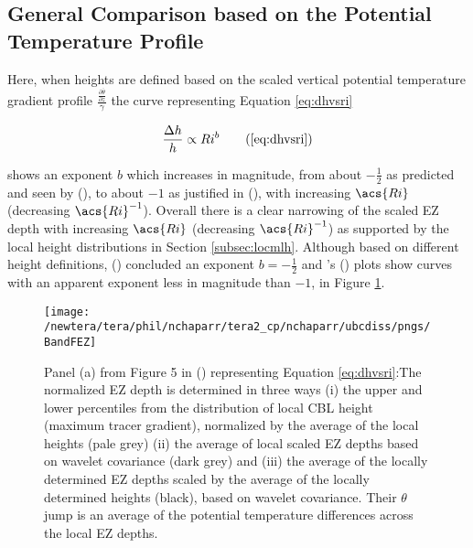 \subsection{General Comparison based on the Potential Temperature Profile}

Here, when heights are defined based on the scaled vertical potential temperature gradient profile $\frac{\frac{\partial \overline{\theta}}{\partial z}}{\gamma}$ the curve representing Equation \ref{eq:dhvsri} 

\begin{equation}
\frac{\Delta h}{h} \propto Ri^{b} \tag{\ref{eq:dhvsri}}
\end{equation}

shows an exponent $b$ which increases in magnitude, from about $-\frac{1}{2}$ as predicted and seen by \citeauthor{Boers89} (\citeyear{Boers89}), to about $-1$ as justified in \citeauthor{StullNelEl} (\citeyear{StullNelEl}),  with increasing $\acs{Ri}$ (decreasing $\acs{Ri}^{-1}$).  Overall there is a clear narrowing of the scaled \acs{EZ} depth with increasing $\acs{Ri}$ (decreasing $\acs{Ri}^{-1}$) as supported by the local height distributions in Section \ref{subsec:locmlh}.  Although based on different height definitions, \citeauthor{FedConzMir04} (\citeyear{FedConzMir04}) concluded an exponent $b = -\frac{1}{2}$ and \citeauthor{BrooksFowler2}'s (\citeyear{BrooksFowler2}) plots show curves with an apparent exponent less in magnitude than $-1$, in Figure \ref{fig:BandFEZ}. \\

\begin{figure}[htbp]
    \centering
    \texttt{[image: /newtera/tera/phil/nchaparr/tera2\_cp/nchaparr/ubcdiss/pngs/BandFEZ]}
    \caption[Relationship of Scaled \acs{EZ} Depth to Richardson Number from \citeauthor{BrooksFowler2}'s (\citeyear{BrooksFowler2})]{Panel (a) from Figure 5 in \citeauthor{BrooksFowler2} (\citeyear{BrooksFowler2}) representing Equation \ref{eq:dhvsri}:The normalized \acs{EZ} depth is determined in three ways (i) the upper and lower percentiles from the distribution of local \acs{CBL} height (maximum tracer gradient), normalized by the average of the local heights (pale grey) (ii) the average of local scaled \acs{EZ} depths based on wavelet covariance (dark grey) and (iii) the average of the locally determined \acs{EZ} depths scaled by the average of the locally determined heights (black), based on wavelet covariance.  Their $\theta$ jump is an average of the potential temperature differences across the local \acs{EZ} depths.}
    \label{fig:BandFEZ}   %
\end{figure}

